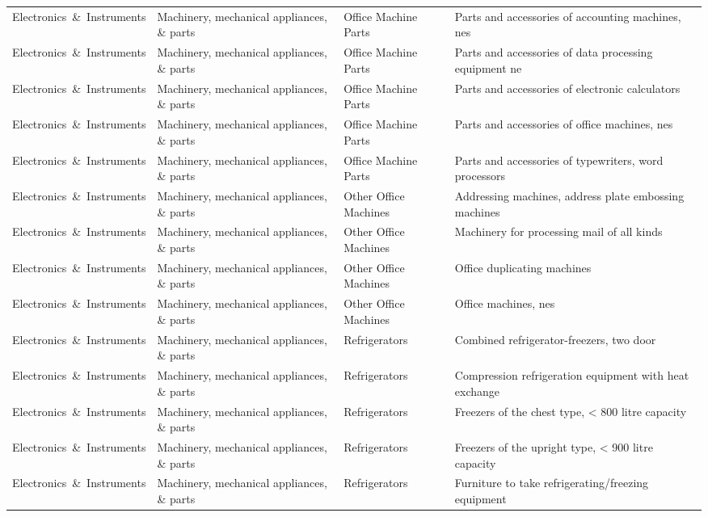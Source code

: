 \begin{appendices}
\begin{xltabular}{\textwidth}{|p{0.14\textwidth}|p{0.28\textwidth}|p{0.18\textwidth}|p{0.30\textwidth}|}
Electronics\ \&\ Instruments & Machinery, mechanical appliances, \& parts & Office Machine Parts & Parts and accessories of accounting machines, nes \\
Electronics\ \&\ Instruments & Machinery, mechanical appliances, \& parts & Office Machine Parts & Parts and accessories of data processing equipment ne \\
Electronics\ \&\ Instruments & Machinery, mechanical appliances, \& parts & Office Machine Parts & Parts and accessories of electronic calculators \\
Electronics\ \&\ Instruments & Machinery, mechanical appliances, \& parts & Office Machine Parts & Parts and accessories of office machines, nes \\
Electronics\ \&\ Instruments & Machinery, mechanical appliances, \& parts & Office Machine Parts & Parts and accessories of typewriters, word processors \\
Electronics\ \&\ Instruments & Machinery, mechanical appliances, \& parts & Other Office Machines & Addressing machines, address plate embossing machines \\
Electronics\ \&\ Instruments & Machinery, mechanical appliances, \& parts & Other Office Machines & Machinery for processing mail of all kinds \\
Electronics\ \&\ Instruments & Machinery, mechanical appliances, \& parts & Other Office Machines & Office duplicating machines \\
Electronics\ \&\ Instruments & Machinery, mechanical appliances, \& parts & Other Office Machines & Office machines, nes \\
Electronics\ \&\ Instruments & Machinery, mechanical appliances, \& parts & Refrigerators & Combined refrigerator-freezers, two door \\
Electronics\ \&\ Instruments & Machinery, mechanical appliances, \& parts & Refrigerators & Compression refrigeration equipment with heat exchange \\
Electronics\ \&\ Instruments & Machinery, mechanical appliances, \& parts & Refrigerators & Freezers of the chest type, < 800 litre capacity \\
Electronics\ \&\ Instruments & Machinery, mechanical appliances, \& parts & Refrigerators & Freezers of the upright type, < 900 litre capacity \\
Electronics\ \&\ Instruments & Machinery, mechanical appliances, \& parts & Refrigerators & Furniture to take refrigerating/freezing equipment \\

\end{xltabular}
\end{appendices}
